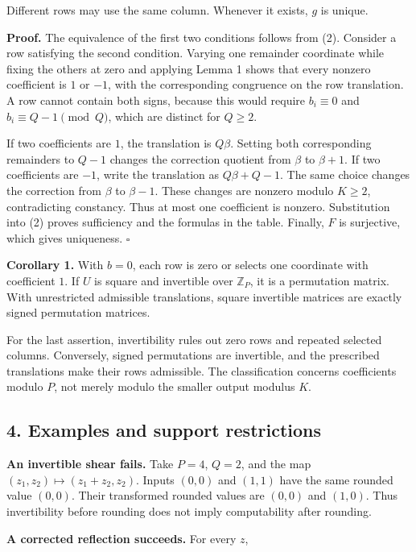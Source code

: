 \documentclass[
]{article}
\begin{document}
Different rows may use the same column. Whenever it exists, \(g\) is
unique.

\textbf{Proof.} The equivalence of the first two conditions follows from
(2). Consider a row satisfying the second condition. Varying one
remainder coordinate while fixing the others at zero and applying Lemma
1 shows that every nonzero coefficient is \(1\) or \(-1\), with the
corresponding congruence on the row translation. A row cannot contain
both signs, because this would require \(b_i\equiv0\) and
\(b_i\equiv Q-1\pmod Q\), which are distinct for \(Q\ge2\).

If two coefficients are \(1\), the translation is \(Q\beta\). Setting
both corresponding remainders to \(Q-1\) changes the correction quotient
from \(\beta\) to \(\beta+1\). If two coefficients are \(-1\), write the
translation as \(Q\beta+Q-1\). The same choice changes the correction
from \(\beta\) to \(\beta-1\). These changes are nonzero modulo
\(K\ge2\), contradicting constancy. Thus at most one coefficient is
nonzero. Substitution into (2) proves sufficiency and the formulas in
the table. Finally, \(F\) is surjective, which gives uniqueness.
\(\square\)

\textbf{Corollary 1.} With \(b=0\), each row is zero or selects one
coordinate with coefficient \(1\). If \(U\) is square and invertible
over \(\mathbb Z_P\), it is a permutation matrix. With unrestricted
admissible translations, square invertible matrices are exactly signed
permutation matrices.

For the last assertion, invertibility rules out zero rows and repeated
selected columns. Conversely, signed permutations are invertible, and
the prescribed translations make their rows admissible. The
classification concerns coefficients modulo \(P\), not merely modulo the
smaller output modulus \(K\).

\subsection{4. Examples and support
restrictions}\label{examples-and-support-restrictions}

\textbf{An invertible shear fails.} Take \(P=4\), \(Q=2\), and the map
\((z_1,z_2)\mapsto(z_1+z_2,z_2)\). Inputs \((0,0)\) and \((1,1)\) have
the same rounded value \((0,0)\). Their transformed rounded values are
\((0,0)\) and \((1,0)\). Thus invertibility before rounding does not
imply computability after rounding.

\textbf{A corrected reflection succeeds.} For every \(z\),
\end{document}

